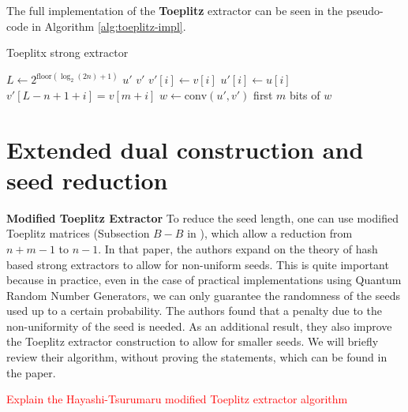 The full implementation of the \textbf{Toeplitz} extractor can be seen in the pseudo-code in Algorithm \ref{alg:toeplitz-impl}.
\begin{algorithm}[h!]
	\caption{Toeplitx strong extractor}
	\label{alg:toeplitz-impl}
	$L \gets 2^{\text{floor}(\log_2(2n)+1)}$ 
	    $u'$ 
	    $v'$ 
	     {
		 $v'[i] \gets v[i]$
	    }
	     {
		 $u'[i] \gets u[i]$
		 $v'[L - n + 1 + i] = v[m + i]$
	    }
	    $w \gets \text{conv}(u', v')$
	    \Return first $m$ bits of $w$
\end{algorithm}


\section{Extended dual construction and seed reduction}


\textbf{Modified Toeplitz Extractor}  To reduce the seed length, one can use modified Toeplitz matrices (Subsection $B-B$ in \cite{Hayashi}), which allow a reduction from $n + m - 1$ to $n - 1$. 
In that paper, the authors expand on the theory of hash based strong extractors to allow for non-uniform seeds. This is quite important because in practice, even in the case of practical implementations using Quantum Random Number Generators, we can only guarantee the randomness of the seeds used up to a certain probability. The authors found that a penalty due to the non-uniformity of the seed is needed. As an additional result, they also improve the Toeplitz extractor construction to allow for smaller seeds. We will briefly review their algorithm, without proving the statements, which can be found in the paper. 

\textcolor{red}{Explain the Hayashi-Tsurumaru modified Toeplitz extractor algorithm}
